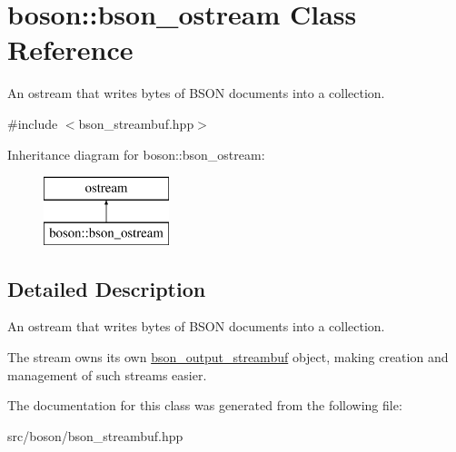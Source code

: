\hypertarget{classboson_1_1bson__ostream}{}\section{boson\+:\+:bson\+\_\+ostream Class Reference}
\label{classboson_1_1bson__ostream}


An ostream that writes bytes of B\+S\+ON documents into a collection.  




{\ttfamily \#include $<$bson\+\_\+streambuf.\+hpp$>$}

Inheritance diagram for boson\+:\+:bson\+\_\+ostream\+:\begin{figure}[H]
\begin{center}
\leavevmode
\includegraphics[height=2.000000cm]{classboson_1_1bson__ostream}
\end{center}
\end{figure}


\subsection{Detailed Description}
An ostream that writes bytes of B\+S\+ON documents into a collection. 

The stream owns its own \hyperlink{classboson_1_1bson__output__streambuf}{bson\+\_\+output\+\_\+streambuf} object, making creation and management of such streams easier. 

The documentation for this class was generated from the following file\+:\begin{DoxyCompactItemize}
\item 
src/boson/bson\+\_\+streambuf.\+hpp\end{DoxyCompactItemize}
